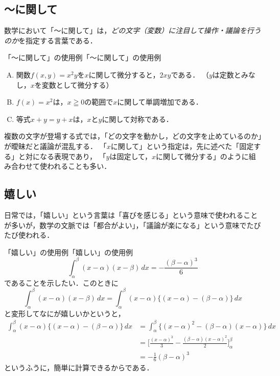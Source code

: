 \subsection{〜に関して}

数学において「〜に関して」は，\emph{どの文字（変数）に注目して操作・議論を行うのか}を指定する言葉である．

\begin{example}{「〜に関して」の使用例}{「〜に関して」の使用例}
  \begin{enumerate}[(A)]
    \item 関数$f(x,y)=x^2 y$を$x$に関して微分すると，$2xy$である．
    （$y$は定数とみなし，$x$を変数として微分する）
    \item $f(x)=x^2$は，$x \geqq 0$の範囲で$x$に関して単調増加である．
    \item 等式$x+y=y+x$は，$x$と$y$に関して対称である．
  \end{enumerate}
\end{example}

複数の文字が登場する式では，「どの文字を動かし，どの文字を止めているのか」が曖昧だと議論が混乱する．
「$x$に関して」という指定は，先に述べた「固定する」と対になる表現であり，
「$y$は固定して，$x$に関して微分する」のように組み合わせて使われることも多い．

\subsection{嬉しい}

日常では，「嬉しい」という言葉は「喜びを感じる」という意味で使われることが多いが，数学の文脈では「都合がよい」，「議論が楽になる」という意味でたびたび使われる．

\begin{example}{「嬉しい」の使用例}{「嬉しい」の使用例}
  \[
    \int_{\alpha}^{\beta} (x-\alpha)(x-\beta)\, dx = -\frac{(\beta-\alpha)^3}{6}
  \]
  であることを示したい．このときに
  \[
    \int_{\alpha}^{\beta} (x-\alpha)(x-\beta)\, dx = \int_{\alpha}^{\beta}  (x-\alpha)\{(x-\alpha) - (\beta-\alpha)\} \, dx
  \]
  と変形してなにが嬉しいかというと，
  \begin{align*}
    \int_{\alpha}^{\beta}  (x-\alpha)\{(x-\alpha) - (\beta-\alpha)\} \, dx & = \int_{\alpha}^{\beta} \{  (x-\alpha)^2 -(\beta-\alpha)(x-\alpha) \} \, dx                        \\
                                                                           & = \Biggl [ \frac{(x-\alpha)^3}{3} - \frac{(\beta-\alpha)(x-\alpha)^2}{2} \Biggr ]_{\alpha}^{\beta} \\
                                                                           & = - \frac{1}{6} (\beta-\alpha)^3
  \end{align*}
  というふうに，簡単に計算できるからである．
\end{example}



